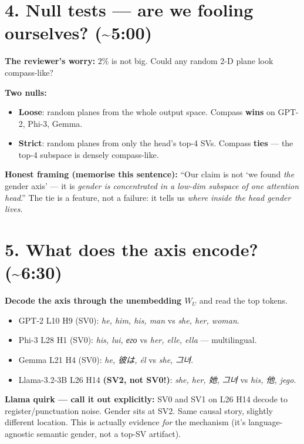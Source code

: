 \documentclass[11pt]{article}
\begin{document}
\section*{4. Null tests --- are we fooling ourselves? (\textasciitilde 5:00)}
\begin{tcolorbox}[beat]
\textbf{The reviewer's worry:} $2\%$ is not big. Could any random 2-D plane
look compass-like?

\textbf{Two nulls:}
\begin{itemize}
  \item \textbf{Loose}: random planes from the whole output space. Compass \textbf{wins} on GPT-2, Phi-3, Gemma.
  \item \textbf{Strict}: random planes from only the head's top-4 SVs. Compass \textbf{ties} --- the top-4 subspace is densely compass-like.
\end{itemize}

\textbf{Honest framing (memorise this sentence):}
``Our claim is not `we found \emph{the} gender axis' --- it is
\emph{gender is concentrated in a low-dim subspace of one attention head}.''
The tie is a feature, not a failure: it tells us \emph{where inside the head
gender lives}.
\end{tcolorbox}

\section*{5. What does the axis encode? (\textasciitilde 6:30)}
\begin{tcolorbox}[beat]
\textbf{Decode the axis through the unembedding $W_U$} and read the top
tokens.
\begin{itemize}
  \item GPT-2 L10 H9 (SV0): \emph{he, him, his, man} vs \emph{she, her, woman}.
  \item Phi-3 L28 H1 (SV0): \emph{his, lui, его} vs \emph{her, elle, ella} --- multilingual.
  \item Gemma L21 H4 (SV0): \emph{he, 彼は, \'el} vs \emph{she, 그녀}.
  \item Llama-3.2-3B L26 H14 \textbf{(SV2, not SV0!)}: \emph{she, her, 她, 그녀} vs \emph{his, 他, jego}.
\end{itemize}

\textbf{Llama quirk --- call it out explicitly:} SV0 and SV1 on L26 H14
decode to register/punctuation noise. Gender sits at SV2. Same causal story,
slightly different location. This is actually evidence \emph{for} the
mechanism (it's language-agnostic semantic gender, not a top-SV artifact).
\end{tcolorbox}
\end{document}
